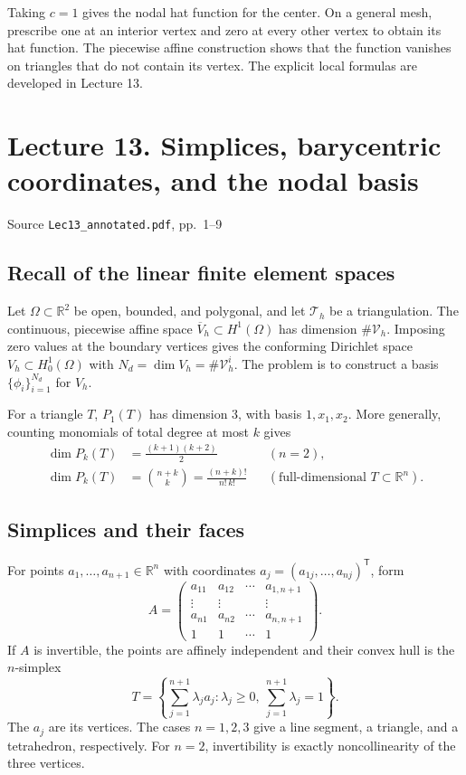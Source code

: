 \documentclass[11pt,a4paper]{article}
\newcommand{\lecturesource}[1]{%
  \par{\small\sffamily\color{Muted}#1}\par\vspace{0.15em}}
\begin{document}
Taking \(c=1\) gives the nodal hat function for the center. On a general
mesh, prescribe one at an interior vertex and zero at every other
vertex to obtain its hat function. The piecewise affine construction
shows that the function vanishes on triangles that do not contain its
vertex. The explicit local formulas are developed in Lecture 13.

\clearpage
\section{Lecture 13. Simplices, barycentric coordinates, and the nodal basis}
\lecturesource{Source \enspace\texttt{Lec13\_annotated.pdf}, pp.~1--9}

\subsection{Recall of the linear finite element spaces}

Let \(\Omega\subset\mathbb R^2\) be open, bounded, and polygonal, and
let \(\mathcal T_h\) be a triangulation. The continuous, piecewise affine
space \(\overline V_h\subset H^1(\Omega)\) has dimension \(\#\mathcal V_h\).
Imposing zero values at the boundary vertices gives the conforming
Dirichlet space \(V_h\subset H_0^1(\Omega)\) with
\(N_d=\dim V_h=\#\mathcal V_h^i\). The problem is to construct a basis
\(\{\phi_i\}_{i=1}^{N_d}\) for \(V_h\).

For a triangle \(T\), \(P_1(T)\) has dimension \(3\), with basis
\(1,x_1,x_2\). More generally, counting monomials of total degree at most
\(k\) gives
\[
 \begin{aligned}\dim P_k(T)&=\frac{(k+1)(k+2)}2 &&(n=2),\\
 \dim P_k(T)&=\binom{n+k}{k}=\frac{(n+k)!}{n!\,k!} &&(\text{full-dimensional }T\subset\mathbb R^n).
 \end{aligned}
\]

\subsection{Simplices and their faces}

For points \(a_1,\ldots,a_{n+1}\in\mathbb R^n\) with coordinates
\(a_j=(a_{1j},\ldots,a_{nj})^\mathsf T\), form
\[
 A=
 \begin{pmatrix}
 a_{11}&a_{12}&\cdots&a_{1,n+1}\\
 \vdots&\vdots&&\vdots\\
 a_{n1}&a_{n2}&\cdots&a_{n,n+1}\\
 1&1&\cdots&1
 \end{pmatrix}.
\]
If \(A\) is invertible, the points are affinely independent and their
convex hull is the \(n\)-simplex
\[
 T=\left\{\sum_{j=1}^{n+1}\lambda_j a_j:
      \lambda_j\geq0,\ \sum_{j=1}^{n+1}\lambda_j=1\right\}.
\]
The \(a_j\) are its vertices. The cases \(n=1,2,3\) give a line segment,
a triangle, and a tetrahedron, respectively. For \(n=2\),
invertibility is exactly noncollinearity of the three vertices.
\end{document}
